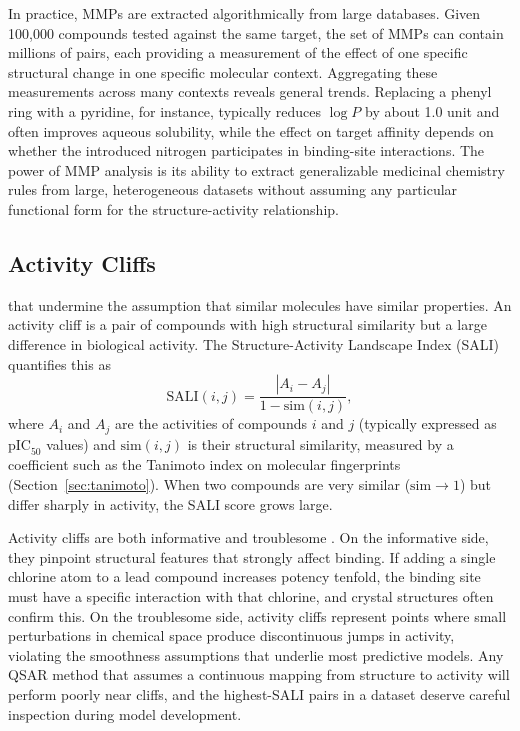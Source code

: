 In practice, MMPs are extracted algorithmically from large databases. Given 100,000 compounds tested against the same target, the set of MMPs can contain millions of pairs, each providing a measurement of the effect of one specific structural change in one specific molecular context. Aggregating these measurements across many contexts reveals general trends. Replacing a phenyl ring with a pyridine, for instance, typically reduces $\log P$ by about 1.0 unit and often improves aqueous solubility, while the effect on target affinity depends on whether the introduced nitrogen participates in binding-site interactions. The power of MMP analysis is its ability to extract generalizable medicinal chemistry rules from large, heterogeneous datasets without assuming any particular functional form for the structure-activity relationship.


\subsection{Activity Cliffs}
\label{sec:activity-cliffs}

 that undermine the assumption that similar molecules have similar properties. An activity cliff is a pair of compounds with high structural similarity but a large difference in biological activity. The Structure-Activity Landscape Index (SALI) quantifies this as
\begin{equation}
  \label{eq:sali}
  \text{SALI}(i,j) = \frac{|A_i - A_j|}{1 - \text{sim}(i,j)},
\end{equation}
where $A_i$ and $A_j$ are the activities of compounds $i$ and $j$ (typically expressed as $\text{pIC}_{50}$ values) and $\text{sim}(i,j)$ is their structural similarity, measured by a coefficient such as the Tanimoto index on molecular fingerprints (Section~\ref{sec:tanimoto}). When two compounds are very similar ($\text{sim} \to 1$) but differ sharply in activity, the SALI score grows large.

Activity cliffs are both informative and troublesome \cite{stumpfe2012}. On the informative side, they pinpoint structural features that strongly affect binding. If adding a single chlorine atom to a lead compound increases potency tenfold, the binding site must have a specific interaction with that chlorine, and crystal structures often confirm this. On the troublesome side, activity cliffs represent points where small perturbations in chemical space produce discontinuous jumps in activity, violating the smoothness assumptions that underlie most predictive models. Any QSAR method that assumes a continuous mapping from structure to activity will perform poorly near cliffs, and the highest-SALI pairs in a dataset deserve careful inspection during model development.


